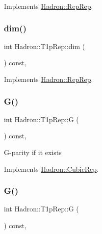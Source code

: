 Implements \mbox{\hyperlink{structHadron_1_1RepRep_a92c8802e5ed7afd7da43ccfd5b7cd92b}{Hadron\+::\+Rep\+Rep}}.

\mbox{\label{structHadron_1_1T1pRep_a8701f4d6be60663f10c103c8c53a191a}} 
\subsubsection{\texorpdfstring{dim()}{dim()}\hspace{0.1cm}{\footnotesize\ttfamily [3/3]}}
{\footnotesize\ttfamily int Hadron\+::\+T1p\+Rep\+::dim (\begin{DoxyParamCaption}{ }\end{DoxyParamCaption}) const\hspace{0.3cm}{\ttfamily [inline]}, {\ttfamily [virtual]}}



Implements \mbox{\hyperlink{structHadron_1_1RepRep_a92c8802e5ed7afd7da43ccfd5b7cd92b}{Hadron\+::\+Rep\+Rep}}.

\mbox{\label{structHadron_1_1T1pRep_a750ea3ae748850c4d00338574076d7e0}} 
\subsubsection{\texorpdfstring{G()}{G()}\hspace{0.1cm}{\footnotesize\ttfamily [1/2]}}
{\footnotesize\ttfamily int Hadron\+::\+T1p\+Rep\+::G (\begin{DoxyParamCaption}{ }\end{DoxyParamCaption}) const\hspace{0.3cm}{\ttfamily [inline]}, {\ttfamily [virtual]}}

G-\/parity if it exists 

Implements \mbox{\hyperlink{structHadron_1_1CubicRep_a52104e43266d1614c00bbd1c3b395458}{Hadron\+::\+Cubic\+Rep}}.

\mbox{\label{structHadron_1_1T1pRep_a750ea3ae748850c4d00338574076d7e0}} 
\subsubsection{\texorpdfstring{G()}{G()}\hspace{0.1cm}{\footnotesize\ttfamily [2/2]}}
{\footnotesize\ttfamily int Hadron\+::\+T1p\+Rep\+::G (\begin{DoxyParamCaption}{ }\end{DoxyParamCaption}) const\hspace{0.3cm}{\ttfamily [inline]}, {\ttfamily [virtual]}}

